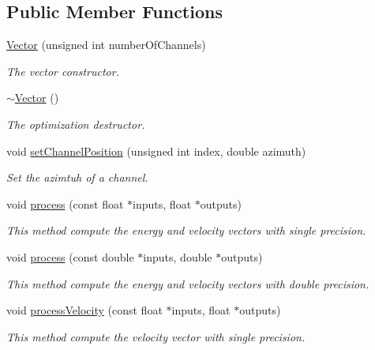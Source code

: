 \subsection*{Public Member Functions}
\begin{DoxyCompactItemize}
\item 
\hyperlink{class_hoa2_d_1_1_vector_aee9bdb6355b741ca4ae90286745de397}{Vector} (unsigned int number\-Of\-Channels)
\begin{DoxyCompactList}\small\item\em The vector constructor. \end{DoxyCompactList}\item 
\hyperlink{class_hoa2_d_1_1_vector_aa260b1636ddc02ac37279f1b3c6160da}{$\sim$\-Vector} ()
\begin{DoxyCompactList}\small\item\em The optimization destructor. \end{DoxyCompactList}\item 
void \hyperlink{class_hoa2_d_1_1_vector_a4bc03e92cd2bd7a2ffb4f8c3358631f6}{set\-Channel\-Position} (unsigned int index, double azimuth)
\begin{DoxyCompactList}\small\item\em Set the azimtuh of a channel. \end{DoxyCompactList}\item 
void \hyperlink{class_hoa2_d_1_1_vector_aba460ca0df1e870dcb958771b9687d9b}{process} (const float $\ast$inputs, float $\ast$outputs)
\begin{DoxyCompactList}\small\item\em This method compute the energy and velocity vectors with single precision. \end{DoxyCompactList}\item 
void \hyperlink{class_hoa2_d_1_1_vector_a3715759c77efd66a05f19a0b62387700}{process} (const double $\ast$inputs, double $\ast$outputs)
\begin{DoxyCompactList}\small\item\em This method compute the energy and velocity vectors with double precision. \end{DoxyCompactList}\item 
void \hyperlink{class_hoa2_d_1_1_vector_a439e3c413c03c40abd0b3c836ccd92dc}{process\-Velocity} (const float $\ast$inputs, float $\ast$outputs)
\begin{DoxyCompactList}\small\item\em This method compute the velocity vector with single precision. \end{DoxyCompactList}\item 

\end{DoxyCompactItemize}
